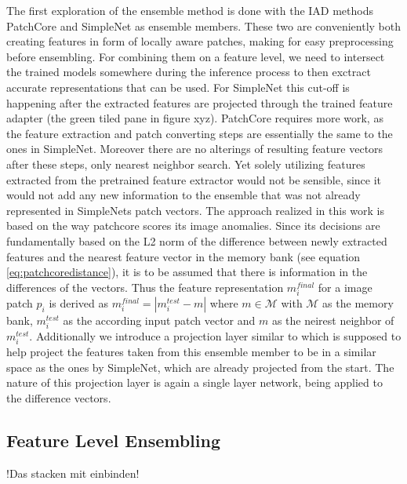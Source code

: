 The first exploration of the ensemble method is done with the IAD methods PatchCore \cite{patchCore2022} and SimpleNet \cite{liu2023simplenet} as ensemble members. These two 
are conveniently both creating features in form of locally aware patches, making for easy preprocessing before ensembling. For combining them on a 
feature level, we need to intersect the trained models somewhere during the inference process to then exctract accurate representations that can be used. 
For SimpleNet this cut-off is happening after the extracted features are projected through the trained feature adapter (the green tiled pane in figure xyz). 
PatchCore requires more work, as the feature extraction and patch converting steps are essentially the same to the ones in SimpleNet. Moreover there are no alterings of resulting feature vectors 
after these steps, only nearest neighbor search. Yet solely utilizing features extracted 
from the pretrained feature extractor would not be sensible, since it would not add any new information to the ensemble that was not already represented in SimpleNets patch vectors. 
The approach realized in this work is based on the way patchcore scores its image anomalies. Since its decisions are fundamentally based on the L2 norm of the difference between newly extracted 
features and the nearest feature vector in the memory bank (see equation \ref{eq:patchcoredistance}), it is to be assumed that there is information in the differences of the vectors. Thus the 
feature representation $m^{final}_i$ for a image patch $p_i$ is derived as $m^{final}_i = | m_i^{test} - m |$ where $m \in \mathcal{M}$ with $\mathcal{M}$ as the memory bank, $m_i^{test}$ as the 
according input patch vector and $m$ as the neirest neighbor of $m_i^{test}$. Additionally we introduce a projection layer similar to \cite{liu2023simplenet} which is supposed to help project the 
features taken from this ensemble member to be in a similar space as the ones by SimpleNet, which are already projected from the start. The nature of this projection layer is again a single 
layer network, being applied to the difference vectors.



\subsection{Feature Level Ensembling}
\label{sec:featurelevelensemble}

!Das stacken mit einbinden!

